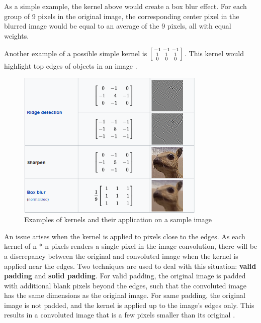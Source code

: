\documentclass[12pt,a4paper,notitlepage]{article}
\begin{document}
As a simple example, the kernel above would create a box blur effect. For each group of 9 pixels in the original image, the corresponding center pixel in the blurred image would be equal to an average of the 9 pixels, all with equal weights.

Another example of a possible simple kernel is \(\begin{bsmallmatrix}-1 & -1 & -1 \\ 1 & 1 & 1 \\ 0 & 0 & 0\end{bsmallmatrix}\). This kernel would highlight top edges of objects in an image \cite{deep_lizard_convolutional_2017}.

\begin{figure}[htbp]
	\centering
		\includegraphics[width=0.8\textwidth]{images/image-convolutions-examples.png}
	\caption{Examples of kernels and their application on a sample image \cite{wikipedia_collaborators_kernel_2022}}
	\label{fig:image-convolutions-examples}
\end{figure}

An issue arises when the kernel is applied to pixels close to the edges. As each kernel of n * n pixels renders a single pixel in the image convolution, there will be a discrepancy between the original and convoluted image when the kernel is applied near the edges. Two techniques are used to deal with this situation: \textbf{valid padding} and \textbf{solid padding}. For valid padding, the original image is padded with additional blank pixels beyond the edges, such that the convoluted image has the same dimensions as the original image. For same padding, the original image is not padded, and the kernel is applied up to the image's edges only. This results in a convoluted image that is a few pixels smaller than its original \cite{sanderson_convolutions_2020}.
\end{document}
